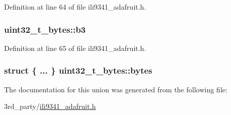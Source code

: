 Definition at line 64 of file ili9341\+\_\+adafruit.\+h.

\subsubsection[{\texorpdfstring{b3}{b3}}]{ uint32\+\_\+t\+\_\+bytes\+::b3}\hypertarget{unionuint32__t__bytes_abd7739cae59fab7cf712d53f337b378a}{}\label{unionuint32__t__bytes_abd7739cae59fab7cf712d53f337b378a}


Definition at line 65 of file ili9341\+\_\+adafruit.\+h.

\subsubsection[{\texorpdfstring{bytes}{bytes}}]{\setlength{\rightskip}{0pt plus 5cm}struct \{ ... \}   uint32\+\_\+t\+\_\+bytes\+::bytes}\hypertarget{unionuint32__t__bytes_a50aeebe398ee3b740421f1cc8d8583b8}{}\label{unionuint32__t__bytes_a50aeebe398ee3b740421f1cc8d8583b8}


The documentation for this union was generated from the following file\+:\begin{DoxyCompactItemize}
\item 
3rd\+\_\+party/\hyperlink{ili9341__adafruit_8h}{ili9341\+\_\+adafruit.\+h}\end{DoxyCompactItemize}
